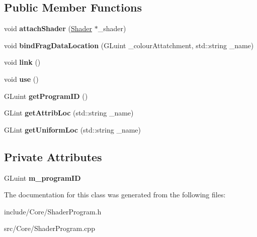 \subsection*{Public Member Functions}
\begin{DoxyCompactItemize}
\item 
\hypertarget{class_shader_program_a9dc8fd5b84bdd2b291152b0885535a98}{void {\bfseries attach\-Shader} (\hyperlink{class_shader}{Shader} $\ast$\-\_\-shader)}\label{class_shader_program_a9dc8fd5b84bdd2b291152b0885535a98}

\item 
\hypertarget{class_shader_program_a85af8430367b97badd970c7d45ff2a62}{void {\bfseries bind\-Frag\-Data\-Location} (G\-Luint \-\_\-colour\-Attatchment, std\-::string \-\_\-name)}\label{class_shader_program_a85af8430367b97badd970c7d45ff2a62}

\item 
\hypertarget{class_shader_program_ade9890eb840126bd3f9b9db42389253c}{void {\bfseries link} ()}\label{class_shader_program_ade9890eb840126bd3f9b9db42389253c}

\item 
\hypertarget{class_shader_program_a285c27da064068522f4900a8e8075f68}{void {\bfseries use} ()}\label{class_shader_program_a285c27da064068522f4900a8e8075f68}

\item 
\hypertarget{class_shader_program_a4bc838439dd995dfd7aafd337fa28995}{G\-Luint {\bfseries get\-Program\-I\-D} ()}\label{class_shader_program_a4bc838439dd995dfd7aafd337fa28995}

\item 
\hypertarget{class_shader_program_a244dbb8783ea4a8030841a0c8e646b0f}{G\-Lint {\bfseries get\-Attrib\-Loc} (std\-::string \-\_\-name)}\label{class_shader_program_a244dbb8783ea4a8030841a0c8e646b0f}

\item 
\hypertarget{class_shader_program_abfed9a7c494ed3c991d017e788dc0883}{G\-Lint {\bfseries get\-Uniform\-Loc} (std\-::string \-\_\-name)}\label{class_shader_program_abfed9a7c494ed3c991d017e788dc0883}

\end{DoxyCompactItemize}
\subsection*{Private Attributes}
\begin{DoxyCompactItemize}
\item 
\hypertarget{class_shader_program_ac1d443cf21df1b64bf50f137a154d9af}{G\-Luint {\bfseries m\-\_\-program\-I\-D}}\label{class_shader_program_ac1d443cf21df1b64bf50f137a154d9af}

\end{DoxyCompactItemize}


The documentation for this class was generated from the following files\-:\begin{DoxyCompactItemize}
\item 
include/\-Core/Shader\-Program.\-h\item 
src/\-Core/Shader\-Program.\-cpp\end{DoxyCompactItemize}
